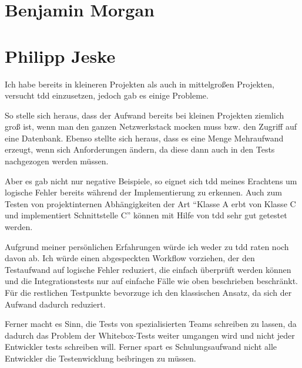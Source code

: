 \documentclass{mitschrift}
\newcommand{\pje}{\marginpar{Philipp\\Jeske}}
\newcommand{\bmn}{\marginpar{Benjamin\\Morgan}}
\begin{document}
\section{Benjamin Morgan}
\bmn
\section{Philipp Jeske}
\pje
Ich habe bereits in kleineren Projekten als auch in mittelgroßen Projekten, versucht \gls{tdd} einzusetzen, jedoch gab es einige Probleme. 

So stelle sich heraus, dass der Aufwand bereits bei kleinen Projekten ziemlich groß ist, wenn man den ganzen Netzwerkstack mocken muss bzw. den Zugriff auf eine Datenbank. Ebenso stellte sich heraus, dass es eine Menge Mehraufwand erzeugt, wenn sich Anforderungen ändern, da diese dann auch in den Tests nachgezogen werden müssen.

Aber es gab nicht nur negative Beispiele, so eignet sich \gls{tdd} meines Erachtens um logische Fehler bereits während der Implementierung zu erkennen. Auch zum Testen von projektinternen Abhängigkeiten der Art "`Klasse A erbt von Klasse C und implementiert Schnittstelle C"' können mit Hilfe von \gls{tdd} sehr gut getestet werden.

Aufgrund meiner persönlichen Erfahrungen würde ich weder zu \gls{tdd} raten noch davon ab. Ich würde einen abgespeckten Workflow vorziehen, der den Testaufwand auf logische Fehler reduziert, die einfach überprüft werden können und die Integrationstests nur auf einfache Fälle wie oben beschrieben beschränkt. Für die restlichen Testpunkte bevorzuge ich den klassischen Ansatz, da sich der Aufwand dadurch reduziert.

Ferner macht es Sinn, die Tests von spezialisierten Teams schreiben zu lassen, da dadurch das Problem der Whitebox-Tests weiter umgangen wird und nicht jeder Entwickler tests schreiben will. Ferner spart es Schulungsaufwand nicht alle Entwickler die Testenwicklung beibringen zu müssen.




\printglossary
\end{document}
